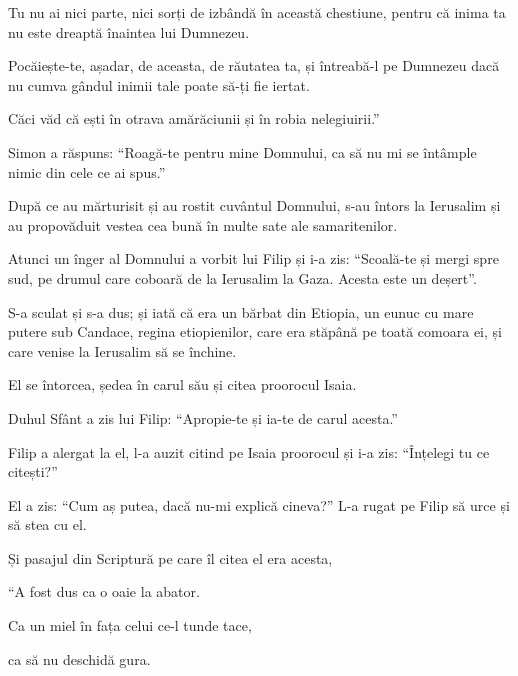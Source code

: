 {Tu nu ai nici parte, nici sorți de izbândă în această chestiune, pentru că inima ta nu este dreaptă înaintea lui Dumnezeu.

Pocăiește-te, așadar, de aceasta, de răutatea ta, și întreabă-l pe Dumnezeu dacă nu cumva gândul inimii tale poate să-ți fie iertat.

Căci văd că ești în otrava amărăciunii și în robia nelegiuirii.”


\par }{\PP {}Simon a răspuns: “Roagă-te pentru mine Domnului, ca să nu mi se întâmple nimic din cele ce ai spus.”


\par }{\PP {}După ce au mărturisit și au rostit cuvântul Domnului, s-au întors la Ierusalim și au propovăduit vestea cea bună în multe sate ale samaritenilor.


\par }{\PP {}Atunci un înger al Domnului a vorbit lui Filip și i-a zis: “Scoală-te și mergi spre sud, pe drumul care coboară de la Ierusalim la Gaza. Acesta este un deșert”.


\par }{\PP {}S-a sculat și s-a dus; și iată că era un bărbat din Etiopia, un eunuc cu mare putere sub Candace, regina etiopienilor, care era stăpână pe toată comoara ei, și care venise la Ierusalim să se închine.

El se întorcea, ședea în carul său și citea proorocul Isaia.


\par }{\PP {}Duhul Sfânt a zis lui Filip: “Apropie-te și ia-te de carul acesta.”


\par }{\PP {}Filip a alergat la el, l-a auzit citind pe Isaia proorocul și i-a zis: “Înțelegi tu ce citești?”


\par }{\PP {}El a zis: “Cum aș putea, dacă nu-mi explică cineva?” L-a rugat pe Filip să urce și să stea cu el.

Și pasajul din Scriptură pe care îl citea el era acesta,

\par }{\Q “A fost dus ca o oaie la abator.

\par }{\QB Ca un miel în fața celui ce-l tunde tace,

\par }{\QB ca să nu deschidă gura.


}
